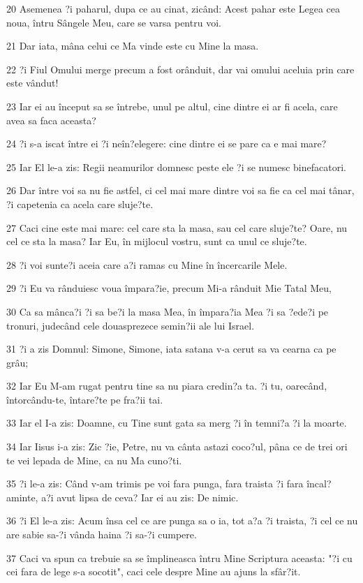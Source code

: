 \par 20 Asemenea ?i paharul, dupa ce au cinat, zicând: Acest pahar este Legea cea noua, întru Sângele Meu, care se varsa pentru voi.
\par 21 Dar iata, mâna celui ce Ma vinde este cu Mine la masa.
\par 22 ?i Fiul Omului merge precum a fost orânduit, dar vai omului aceluia prin care este vândut!
\par 23 Iar ei au început sa se întrebe, unul pe altul, cine dintre ei ar fi acela, care avea sa faca aceasta?
\par 24 ?i s-a iscat între ei ?i neîn?elegere: cine dintre ei se pare ca e mai mare?
\par 25 Iar El le-a zis: Regii neamurilor domnesc peste ele ?i se numesc binefacatori.
\par 26 Dar între voi sa nu fie astfel, ci cel mai mare dintre voi sa fie ca cel mai tânar, ?i capetenia ca acela care sluje?te.
\par 27 Caci cine este mai mare: cel care sta la masa, sau cel care sluje?te? Oare, nu cel ce sta la masa? Iar Eu, în mijlocul vostru, sunt ca unul ce sluje?te.
\par 28 ?i voi sunte?i aceia care a?i ramas cu Mine în încercarile Mele.
\par 29 ?i Eu va rânduiesc voua împara?ie, precum Mi-a rânduit Mie Tatal Meu,
\par 30 Ca sa mânca?i ?i sa be?i la masa Mea, în împara?ia Mea ?i sa ?ede?i pe tronuri, judecând cele douasprezece semin?ii ale lui Israel.
\par 31 ?i a zis Domnul: Simone, Simone, iata satana v-a cerut sa va cearna ca pe grâu;
\par 32 Iar Eu M-am rugat pentru tine sa nu piara credin?a ta. ?i tu, oarecând, întorcându-te, întare?te pe fra?ii tai.
\par 33 Iar el I-a zis: Doamne, cu Tine sunt gata sa merg ?i în temni?a ?i la moarte.
\par 34 Iar Iisus i-a zis: Zic ?ie, Petre, nu va cânta astazi coco?ul, pâna ce de trei ori te vei lepada de Mine, ca nu Ma cuno?ti.
\par 35 ?i le-a zis: Când v-am trimis pe voi fara punga, fara traista ?i fara încal?aminte, a?i avut lipsa de ceva? Iar ei au zis: De nimic.
\par 36 ?i El le-a zis: Acum însa cel ce are punga sa o ia, tot a?a ?i traista, ?i cel ce nu are sabie sa-?i vânda haina ?i sa-?i cumpere.
\par 37 Caci va spun ca trebuie sa se împlineasca întru Mine Scriptura aceasta: "?i cu cei fara de lege s-a socotit", caci cele despre Mine au ajuns la sfâr?it.
